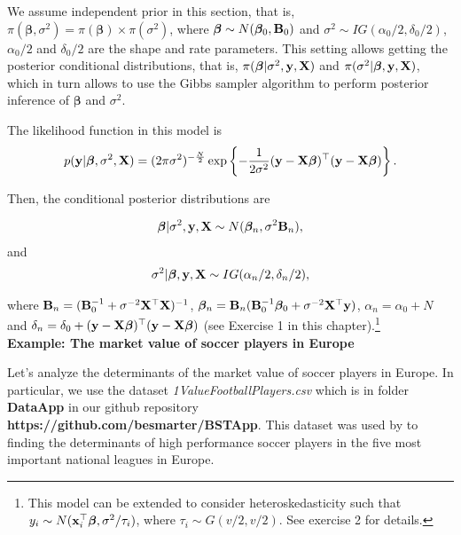 We assume independent prior in this section, that is, $\pi(\bm{\beta},\sigma^2)=\pi(\bm{\beta})\times\pi(\sigma^2)$, where $\bm{\beta} \sim N(\bm{\beta}_0, {\bf{B}}_0)$ and $\sigma^2 \sim IG(\alpha_0/2, \delta_0/2)$, $\alpha_0/2$ and $\delta_0/2$ are the shape and rate parameters. This setting allows getting the posterior conditional distributions, that is, $\pi(\bm{\beta}|\sigma^2,{\bf{y}}, {\bf{X}})$ and $\pi(\sigma^2|\bm{\beta},{\bf{y}}, {\bf{X}})$, which in turn allows to use the Gibbs sampler algorithm to perform posterior inference of $\bm{\beta}$ and $\sigma^2$.

The likelihood function in this model is
\begin{align*}
	p({\bf{y}}| \bm{\beta}, \sigma^2, {\bf{X}}) = (2\pi\sigma^2)^{-\frac{N}{2}} \exp \left\{-\frac{1}{2\sigma^2} ({\bf{y}} - \bf{X\bm{\beta}})^{\top}({\bf{y}} - \bf{X\bm{\beta}}) \right\}.
\end{align*}

Then, the conditional posterior distributions are

\begin{align*}
	\bm{\beta}|\sigma^2, {\bf{y}}, {\bf{X}} \sim N(\bm{\beta}_n, \sigma^2{\bf{B}}_n),
\end{align*}
and
\begin{align*}
	\sigma^2|\bm{\beta}, {\bf{y}}, {\bf{X}} \sim IG(\alpha_n/2, \delta_n/2),
\end{align*}

 where ${\bf{B}}_n = ({\bf{B}}_0^{-1} + \sigma^{-2} {\bf{X}}^{\top}{\bf{X}})^{-1}$, $\bm{\beta}_n= {\bf{B}}_n({\bf{B}}_0^{-1}\bm{\beta}_0 + \sigma^{-2} {\bf{X}}^{\top}{\bf{y}})$, $\alpha_n = \alpha_0 + N$ and $\delta_n = \delta_0 + ({\bf{y}}-{\bf{X}}\bm{\beta})^{\top}({\bf{y}}-{\bf{X}}\bm{\beta})$ (see Exercise 1 in this chapter).\footnote{This model can be extended to consider heteroskedasticity such that $y_i\sim N({\bf{x}}_i^{\top}\bm{\beta}, \sigma^2/\tau_i)$, where $\tau_i\sim G(v/2,v/2)$. See exercise 2 for details.}\\

\textbf{Example: The market value of soccer players in Europe}

Let's analyze the determinants of the market value of soccer players in Europe. In particular, we use the dataset \textit{1ValueFootballPlayers.csv} which is in folder \textbf{DataApp} in our github repository \textbf{https://github.com/besmarter/BSTApp}. This dataset was used by \cite{Serna2018} to finding the determinants of high performance soccer players in the five most important national leagues in Europe.

